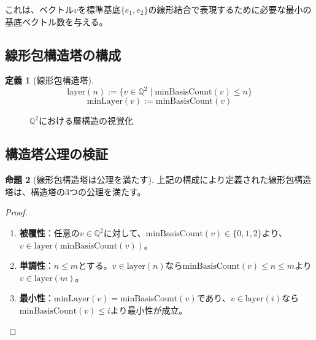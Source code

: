 \documentclass[a4paper,12pt]{ltjsarticle}
\theoremstyle{definition}
\newtheorem{definition}{定義}[section]
\newtheorem{proposition}[definition]{命題}
\begin{document}
これは、ベクトル$v$を標準基底$\{e_1, e_2\}$の線形結合で表現するために必要な最小の基底ベクトル数を与える。

\subsection{線形包構造塔の構成}

\begin{definition}[線形包構造塔]
$$\text{layer}(n) := \{v \in \mathbb{Q}^2 \mid \text{minBasisCount}(v) \leq n\}$$
$$\text{minLayer}(v) := \text{minBasisCount}(v)$$
\end{definition}

\begin{figure}[h]
\centering
{}
\caption{$\mathbb{Q}^2$における層構造の視覚化}
\end{figure}

\subsection{構造塔公理の検証}

\begin{proposition}[線形包構造塔は公理を満たす]
上記の構成により定義された線形包構造塔は、構造塔の3つの公理を満たす。
\end{proposition}

\begin{proof}
\begin{enumerate}
\item \textbf{被覆性}：任意の$v \in \mathbb{Q}^2$に対して、$\text{minBasisCount}(v) \in \{0,1,2\}$より、$v \in \text{layer}(\text{minBasisCount}(v))$。

\item \textbf{単調性}：$n \leq m$とする。$v \in \text{layer}(n)$なら$\text{minBasisCount}(v) \leq n \leq m$より$v \in \text{layer}(m)$。

\item \textbf{最小性}：$\text{minLayer}(v) = \text{minBasisCount}(v)$であり、$v \in \text{layer}(i)$なら$\text{minBasisCount}(v) \leq i$より最小性が成立。
\end{enumerate}
\end{proof}
\end{document}
